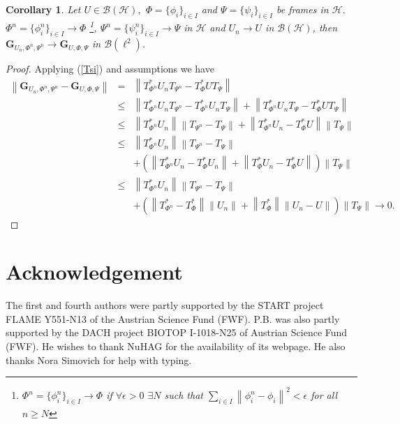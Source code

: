 \documentclass{birkjour}
\newtheorem{cor}[thm]{Corollary}
\theoremstyle{definition}
\theoremstyle{remark}
\numberwithin{equation}{section}
\newcommand{\norm}[2]{
\left\| #2 \right\|_{#1}
}
\def\Hil{\mathcal{H}}
\newcommand{\BL}[1]{
{\mathcal B} \left( #1 \right)
}
\begin{document}
\begin{cor}
Let $U\in \BL{\mathcal{H}},$ $\Phi=\{\phi_{i}\}_{i\in I}$ and $\Psi=\{\psi_{i}\}_{i\in I}$
be frames in $\Hil$.
$\Phi^{n}=\{\phi_{i}^{n}\}_{i\in I}\rightarrow
\Phi$ \footnote{$\Phi^{n}=\{\phi_{i}^{n}\}_{i\in I}\rightarrow
\Phi$ if $\forall \epsilon > 0$ $\exists N$ such that $\sum
\limits_{i \in I} \norm{}{\phi_i^n - \phi_i}^{ 2} < \epsilon$
for all $n \ge N$}, $\Psi^{n}=\{\psi_{i}^{n}\}_{i\in I}\rightarrow
\Psi$ in {$\mathcal{H}$} and $U_n\rightarrow U$ in $\BL{
\mathcal{H}}$, then $\mathbf{G}_{U_n,\Phi^n,\Psi^n}\rightarrow
\mathbf{G}_{U,\Phi,\Psi}$ in $\BL {\ell^{2}}$.
\end{cor}
\begin{proof}
Applying (\ref{Tsi}) and assumptions we have
\begin{eqnarray*}
\left\|\mathbf{G}_{U_n,\Phi^n,\Psi^n}-\mathbf{G}_{U,\Phi,\Psi}\right\|&=&\left\|T_{\Phi^{n}}^*U_nT_{\Psi^n}-T_{\Phi}^*UT_{\Psi}\right\|\\
&\leq&\left\|T_{\Phi^{n}}^*U_nT_{\Psi^n}-T_{\Phi^{n}}^*U_nT_{\Psi}\right\|
+\left\|T_{\Phi^{n}}^*U_nT_{\Psi}-
T_{\Phi}^*UT_{\Psi}\right\|\\
&\leq&\left\|T_{\Phi^{n}}^*U_n\right\|\left\|T_{\Psi^n}-T_{\Psi}\right\|+\left\|T_{\Phi^{n}}^*U_n-T_{\Phi}^*U\right\|\left\|T_{\Psi}\right\|\\
&\leq&\left\|T_{\Phi^{n}}^*U_n\right\|\left\|T_{\Psi^n}-T_{\Psi}\right\|\\
&&+\left(\left\|T_{\Phi^{n}}^*U_n-T_{\Phi}^*U_n\right\|+\left\|T_{\Phi}^*U_n-
T_{\Phi}^*U\right\|\right)\left\|T_{\Psi}\right\|\\
&\leq&\left\|T_{\Phi^{n}}^*U_n\right\|\left\|T_{\Psi^n}-T_{\Psi}\right\|\\
&&+\left(\left\|T_{\Phi^{n}}^*-T_{\Phi}^*\right\|\left\|U_n\right\|+\left\|T_{\Phi}^*\right\|\left\|U_n-
U\right\|\right)\left\|T_{\Psi}\right\|
\rightarrow 0.
\end{eqnarray*}
\end{proof}

\section*{Acknowledgement}
The first and fourth authors were partly supported by the START
project FLAME Y551-N13 of the Austrian Science Fund (FWF). P.B.
was also partly supported by the DACH project BIOTOP I-1018-N25 of
Austrian Science Fund (FWF). He wishes to thank NuHAG for the
availability of its webpage. He also thanks Nora Simovich for help
with typing.
\end{document}

